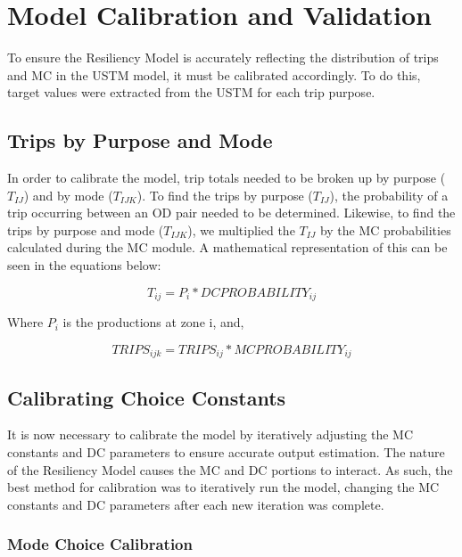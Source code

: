 \section{Model Calibration and Validation}

To ensure the Resiliency Model is accurately reflecting the distribution
of trips and MC in the USTM model, it must be
calibrated accordingly. To do this, target values were extracted from the
USTM for each trip purpose.

\subsection{Trips by Purpose and Mode}

In order to calibrate the model, trip totals needed to be broken up by purpose
($T_{IJ}$) and by mode ($T_{IJK}$). To find the trips by purpose
($T_{IJ}$), the probability of a trip occurring between an OD pair needed to
be determined. Likewise, to find the trips by purpose and mode ($T_{IJK}$),
we multiplied the $T_{IJ}$ by the MC probabilities calculated during the MC
module. A mathematical representation of this can be seen in the equations
below:

\begin{equation}
	T_{ij} = P_i * DCPROBABILITY_{ij}
	\label{eqn:ij}
\end{equation}

\noindent Where $P_i$ is the productions at zone i, and,

\begin{equation}
	TRIPS_{ijk} = TRIPS_{ij} * MCPROBABILITY_{ij}
	\label{eqn:ijk}
\end{equation}

\subsection{Calibrating Choice Constants}

It is now necessary to calibrate the model by iteratively adjusting the MC
constants and DC parameters to ensure accurate output estimation. The nature
of the Resiliency Model causes the MC and DC portions to interact. As such,
the best method for calibration was to iteratively run the model, changing
the MC constants and DC parameters after each new iteration was complete.

\subsubsection{Mode Choice Calibration}

